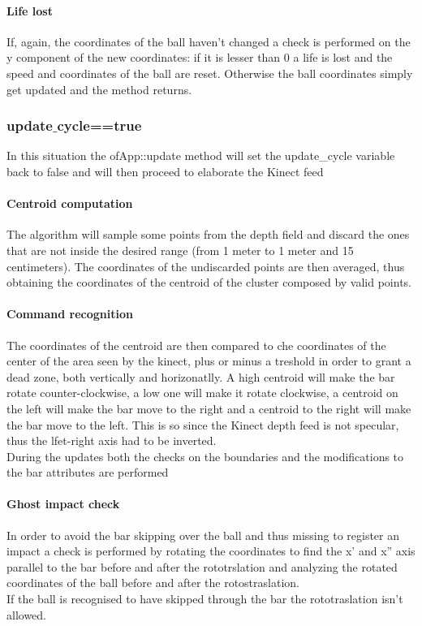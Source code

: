 \documentclass[]{article}
\begin{document}
\paragraph{Life lost}
If, again, the coordinates of the ball haven't changed a check is performed on the y component of the new coordinates: if it is lesser than 0 a life is lost and the speed and coordinates of the ball are reset. Otherwise the ball coordinates simply get updated and the method returns.    
\subsubsection{update$\_$cycle==true} 
In this situation the ofApp::update method will set the update\_cycle variable back to false and will then proceed to elaborate the Kinect feed
\paragraph{Centroid computation}
The algorithm will sample some points from the depth field and discard the ones that are not inside the desired range (from 1 meter to 1 meter and 15 centimeters). The coordinates of the undiscarded points are then averaged, thus obtaining the coordinates of the centroid of the cluster composed by valid points.\\
\paragraph{Command recognition}
The coordinates of the centroid are then compared to che coordinates of the center of the area seen by the kinect, plus or minus a treshold in order to grant a dead zone, both vertically and horizonatlly.
A high centroid will make the bar rotate counter-clockwise, a low one will make it rotate clockwise, a centroid on the left will make the bar move to the right and a centroid to the right will make the bar move to the left.
This is so since the Kinect depth feed is not specular, thus the lfet-right axis had to be inverted.\\
During the updates both the checks on the boundaries and the modifications to the bar attributes are performed
\paragraph{Ghost impact check}
In order to avoid the bar skipping over the ball and thus missing to register an impact a check is performed by rotating the coordinates to find the x' and x'' axis parallel to the bar before and after the rototrslation and analyzing the rotated coordinates of the ball before and after the rotostraslation.\\
If the ball is recognised to have skipped through the bar the rototraslation isn't allowed.
\end{document}
